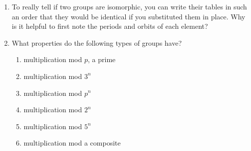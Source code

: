\documentclass[../gatm.tex]{subfiles}
\begin{document}
\begin{enumerate}
\item To really tell if two groups are isomorphic, you can write their tables in such an order that they would be identical if you substituted them in place. Why is it helpful to first note the periods and orbits of each element?
\item What properties do the following types of groups have?
\begin{multicols}{2}
\begin{enumerate}
\item multiplication mod $p$, a prime
\item multiplication mod $3^n$
\item multiplication mod $p^n$
\item multiplication mod $2^n$
\item multiplication mod $5^n$
\item multiplication mod a composite
\end{enumerate}
\end{multicols}
\setcounter{problem_i}{\value{enumi}}
\end{enumerate}
\end{document}
